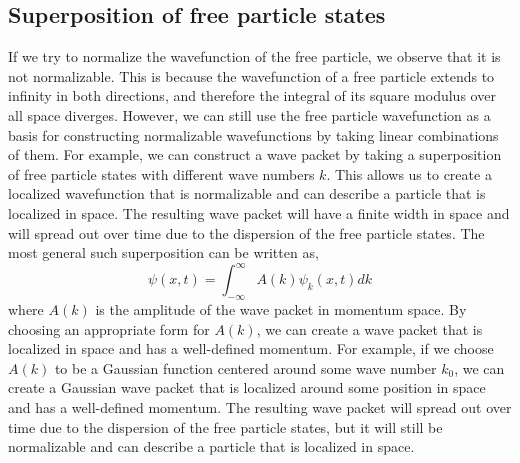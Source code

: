\documentclass{article}
\begin{document}
\subsection{Superposition of free particle states}
If we try to normalize the wavefunction of the free particle, we observe that it is not normalizable. This is because the wavefunction of a free particle extends to infinity in both directions, and therefore the integral of its square modulus over all space diverges. However, we can still use the free particle wavefunction as a basis for constructing normalizable wavefunctions by taking linear combinations of them. For example, we can construct a wave packet by taking a superposition of free particle states with different wave numbers $k$. This allows us to create a localized wavefunction that is normalizable and can describe a particle that is localized in space. The resulting wave packet will have a finite width in space and will spread out over time due to the dispersion of the free particle states.
The most general such superposition can be written as,\
\[\psi(x,t)= \int_{-\infty}^{\infty} A(k)\psi_k(x,t) dk\]
where $A(k)$ is the amplitude of the wave packet in momentum space. By choosing an appropriate form for $A(k)$, we can create a wave packet that is localized in space and has a well-defined momentum. For example, if we choose $A(k)$ to be a Gaussian function centered around some wave number $k_0$, we can create a Gaussian wave packet that is localized around some position in space and has a well-defined momentum. The resulting wave packet will spread out over time due to the dispersion of the free particle states, but it will still be normalizable and can describe a particle that is localized in space.
\end{document}
